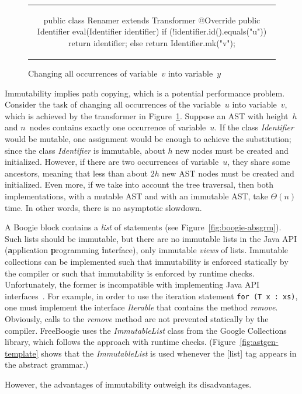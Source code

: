 \documentclass{llncs}
\newcommand{\jmlCode}{\lstinline[style=jml,basicstyle=\normalsize]}
\def\fb#1{{\bf #1}} %
\newcommand{\bc}{\begin{figure}\centering\begin{tabular}{c}} %
\newcommand{\ec}[2]{\end{tabular}\caption{#1}\label{#2}\end{figure}} %
\begin{document}
\bc
\begin{jml}
public class Renamer extends Transformer {
  @Override public Identifier eval(Identifier identifier) {
    if (!identifier.id().equals("u")) return identifier;
    else return Identifier.mk("v");
  }
}
\end{jml}
\ec{Changing all occurrences of variable~$v$ into variable~$y$}
{lst:example-transformer}

Immutability implies path copying, which is a
potential performance problem. Consider the task of
changing all occurrences of the variable~$u$ into
variable~$v$, which is achieved by the transformer in
Figure~\ref{lst:example-transformer}. Suppose an AST with
height~$h$ and $n$~nodes contains exactly one occurrence of
variable~$u$. If the class \textit{Identifier} would be mutable,
one assignment would be enough to achieve the substitution;
since the class \textit{Identifier} is immutable, about $h$ new
nodes must be created and initialized. However, if there are
two occurrences of variable~$u$, they share some ancestors,
meaning that less than about $2h$ new AST nodes must be created
and initialized. Even more, if we take into account the tree
traversal, then both implementations, with a mutable AST and with
an immutable AST, take $\Theta(n)$ time. In other words, there is
no asymptotic slowdown.

A Boogie block contains a \emph{list} of statements (see
Figure~\ref{fig:boogie-absgrm}). Such lists should be immutable,
but there are no immutable lists in the Java API (\fb application
\fb programming \fb interface), only immutable \emph{views} of
lists. Immutable collections can be implemented such that
immutability is enforced statically by the compiler or such
that immutability is enforced by runtime checks. Unfortunately,
the former is incompatible with implementing Java API
interfaces~\cite{javaCollectFaq}. For example, in order to use
the iteration statement
\jmlCode|for (T x : xs)|,
one must implement the interface \textit{Iterable} that
contains the method \textit{remove}. Obviously, calls to
the \textit{remove} method are not prevented statically by
the compiler. FreeBoogie uses the \textit{ImmutableList}
class from the Google Collections~\cite{google-collect}
library, which follows the approach with runtime checks.
(Figure~\ref{fig:astgen-template} shows that the
\textit{ImmutableList} is used whenever the [list] tag appears in
the abstract grammar.)

However, the advantages of immutability outweigh its
disadvantages.
\end{document}
